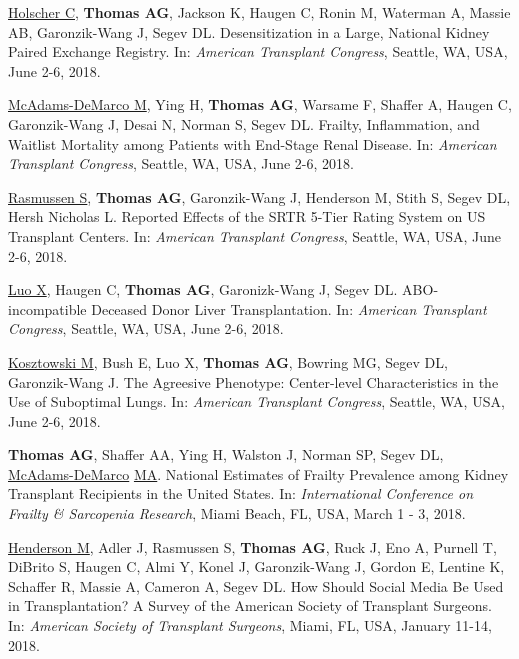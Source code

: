 \documentclass[10pt]{article}
\makeatletter
\newlength{\bibhang}
\newlength{\bibsep}
 {\@listi \global\bibsep\itemsep \global\advance\bibsep by\parsep}
\newenvironment{bibenum*}
  {\renewcommand\labelenumi{[\theenumi]}%
   \etaremune[
     topsep=0pt,
     itemsep=\bibsep,
     parsep=0pt,partopsep=0pt,
     itemindent=-\bibhang,
     leftmargin={\bibhang+\widthof{[999]}}]}
  {\endetaremune}
\makeatother
\begin{document}
\begin{bibenum*}
\item \underline{Holscher C}, \textbf{Thomas AG}, Jackson K, Haugen C,
  Ronin M, Waterman A, Massie AB, Garonzik-Wang J, Segev DL.
  Desensitization in a Large, National Kidney Paired Exchange Registry.
  In: \emph{American Transplant Congress},
  Seattle, WA, USA, June 2-6, 2018.

\item \underline{McAdams-DeMarco M}, Ying H, \textbf{Thomas AG},
  Warsame F, Shaffer A, Haugen C, Garonzik-Wang J, Desai N,
  Norman S, Segev DL. Frailty, Inflammation, and Waitlist
  Mortality among Patients with End-Stage Renal Disease.
  In: \emph{American Transplant Congress},
  Seattle, WA, USA, June 2-6, 2018.

\item \underline{Rasmussen S}, \textbf{Thomas AG}, Garonzik-Wang J,
  Henderson M, Stith S, Segev DL, Hersh Nicholas L. Reported Effects
  of the SRTR 5-Tier Rating System on US Transplant Centers.
  In: \emph{American Transplant Congress},
  Seattle, WA, USA, June 2-6, 2018.

\item \underline{Luo X}, Haugen C, \textbf{Thomas AG},
  Garonizk-Wang J, Segev DL.
  ABO-incompatible Deceased Donor Liver Transplantation.
  In: \emph{American Transplant Congress},
  Seattle, WA, USA, June 2-6, 2018.

\item \underline{Kosztowski M}, Bush E, Luo X, \textbf{Thomas AG},
  Bowring MG, Segev DL, Garonzik-Wang J.
  The Agreesive Phenotype: Center-level Characteristics in the Use
  of Suboptimal Lungs.
  In: \emph{American Transplant Congress},
  Seattle, WA, USA, June 2-6, 2018.

\item \textbf{Thomas AG}, Shaffer AA, Ying H, Walston J,
  Norman SP, Segev DL, \underline{McAdams-DeMarco} \underline{MA}.
  National Estimates of Frailty Prevalence among Kidney
  Transplant Recipients in the United States.
  In: \emph{International Conference on Frailty \& Sarcopenia Research},
  Miami Beach, FL, USA, March 1 - 3, 2018.

\item \underline{Henderson M}, Adler J, Rasmussen S, \textbf{Thomas AG},
  Ruck J, Eno A, Purnell T, DiBrito S, Haugen C, Almi Y, Konel J,
  Garonzik-Wang J, Gordon E, Lentine K, Schaffer R, Massie A,
  Cameron A, Segev DL.
  How Should Social Media Be Used in Transplantation? A Survey of
  the American Society of Transplant Surgeons.
  In: \emph{American Society of Transplant Surgeons},
  Miami, FL, USA, January 11-14, 2018.


\end{bibenum*}
\end{document}

